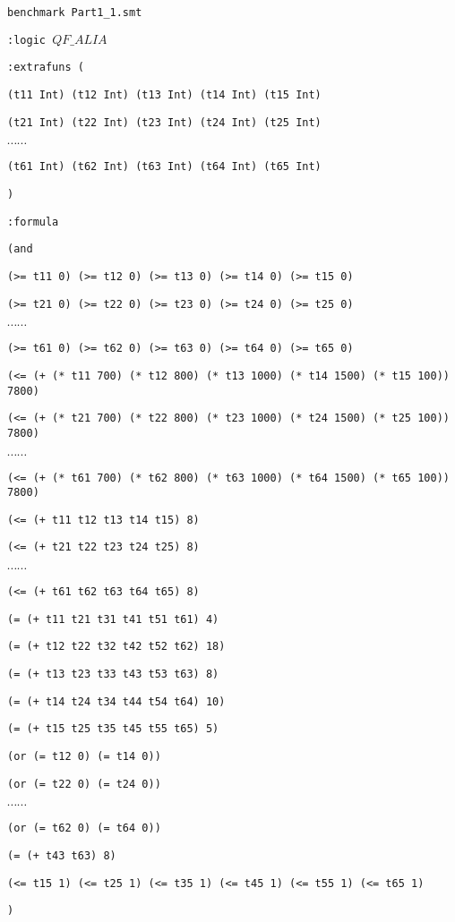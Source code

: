 \documentclass[11pt]{article}
\begin{document}
{\footnotesize

{\tt benchmark Part1\_1.smt}

{\tt :logic $QF\_ALIA$}

{\tt :extrafuns (}

{\tt (t11 Int) (t12 Int) (t13 Int) (t14 Int) (t15 Int) }

{\tt (t21 Int) (t22 Int) (t23 Int) (t24 Int) (t25 Int) }

$\cdots \cdots$

{\tt (t61 Int) (t62 Int) (t63 Int) (t64 Int) (t65 Int) }

{\tt )}

{\tt :formula}

{\tt   (and}

{\tt (>= t11 0) (>= t12 0) (>= t13 0) (>= t14 0) (>= t15 0)}

{\tt (>= t21 0) (>= t22 0) (>= t23 0) (>= t24 0) (>= t25 0)}

$\cdots \cdots$

{\tt (>= t61 0) (>= t62 0) (>= t63 0) (>= t64 0) (>= t65 0) }

{\tt (<= (+ (* t11 700) (* t12 800) (* t13 1000) (* t14 1500) (* t15 100)) 7800)}

{\tt (<= (+ (* t21 700) (* t22 800) (* t23 1000) (* t24 1500) (* t25 100)) 7800)}

$\cdots \cdots$

{\tt (<= (+ (* t61 700) (* t62 800) (* t63 1000) (* t64 1500) (* t65 100)) 7800) }

{\tt (<= (+ t11 t12 t13 t14 t15) 8)}

{\tt (<= (+ t21 t22 t23 t24 t25) 8)}

$\cdots \cdots$

{\tt (<= (+ t61 t62 t63 t64 t65) 8)}

{\tt (= (+ t11 t21 t31 t41 t51 t61) 4)}

{\tt (= (+ t12 t22 t32 t42 t52 t62) 18)}

{\tt (= (+ t13 t23 t33 t43 t53 t63) 8)}

{\tt (= (+ t14 t24 t34 t44 t54 t64) 10)}

{\tt (= (+ t15 t25 t35 t45 t55 t65) 5)}

{\tt (or (= t12 0) (= t14 0)) }

{\tt (or (= t22 0) (= t24 0)) }

$\cdots \cdots$

{\tt (or (= t62 0) (= t64 0)) }

{\tt (= (+ t43 t63) 8) }

{\tt (<= t15 1) (<= t25 1) (<= t35 1) (<= t45 1) (<= t55 1) (<= t65 1)}

{\tt ) }
}
\end{document}
